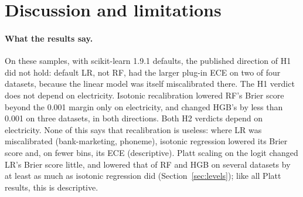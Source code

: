 \documentclass[11pt]{article}
\newcommand{\ds}[1]{\textsf{#1}}
\newcommand{\bm}{\ds{bank-marketing}}
\newcommand{\el}{\ds{electricity}}
\newcommand{\ph}{\ds{phoneme}}
\begin{document}
\begin{table}[!htbp]
\centering
\resizebox{\textwidth}{!}{}
\caption{\el{} under a chronological split: \textbf{a measure of drift, not a test of
random-split leakage.} Each seed's 20,000-row subsample is sorted by file row (the time order)
and split 50/25/25 into training, calibration and test; the three models are refitted and the
calibrators fitted on the calibration quarter. Left: plug-in ECE, Brier score and ROC-AUC as
mean (SD) over 10 seeds. Right, for comparison: ECE and Brier score under the main random
splits (Table~\ref{tab:levels}). Under the chronological split every uncalibrated model is
badly miscalibrated on the test quarter, and recalibration fitted on the calibration quarter
can make the test quarter worse. The split also places every Victoria fill-value row in
training and test dates beyond most of the training range. Descriptive; not counted in any
k-of-4 verdict.}
\label{tab:electime}
\end{table}

\section{Discussion and limitations}
\label{sec:limits}

\paragraph{What the results say.} On these samples, with scikit-learn 1.9.1 defaults,
the published direction of H1 did not hold: default LR, not RF, had the larger plug-in ECE on
two of four datasets, because the linear model was itself miscalibrated there. The H1 verdict
does not depend on \el. Isotonic recalibration lowered RF's Brier score beyond the 0.001
margin only on \el, and changed HGB's by less than 0.001 on three datasets, in both
directions. Both H2 verdicts depend on \el. None of this says that
recalibration is useless: where LR was miscalibrated (\bm, \ph), isotonic regression lowered
its Brier score and, on fewer bins, its ECE (descriptive). Platt scaling on the logit changed
LR's Brier score little, and lowered that of RF and HGB on several datasets by at least as
much as isotonic regression did (Section~\ref{sec:levels}); like all Platt results, this is
descriptive.
\end{document}
